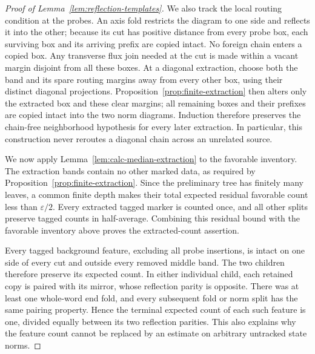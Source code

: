 \begin{proof}[Proof of Lemma~\ref{lem:reflection-templates}]
We also track the local routing condition at the probes. An axis fold
restricts the diagram to one side and reflects it into the other;
because its cut has positive distance from every probe box, each
surviving box and its arriving prefix are copied intact. No foreign
chain enters a copied box. Any transverse flux join needed at the
cut is made within a vacant margin disjoint from all these boxes.
At a diagonal extraction, choose both the band and its spare routing
margins away from every other box, using their distinct diagonal
projections. Proposition~\ref{prop:finite-extraction} then alters only
the extracted box and these clear margins; all remaining boxes and
their prefixes are copied intact into the two norm diagrams. Induction
therefore preserves the chain-free neighborhood hypothesis for every
later extraction. In particular, this construction never reroutes a
diagonal chain across an unrelated source.

We now apply Lemma~\ref{lem:calc-median-extraction} to the
favorable inventory. The extraction bands contain no other marked
data, as required by Proposition~\ref{prop:finite-extraction}.
Since the preliminary tree has finitely many leaves, a common
finite depth makes their total expected residual favorable count
less than $\varepsilon/2$. Every extracted tagged marker is counted
once, and all other splits preserve tagged counts in half-average.
Combining this residual bound with the favorable inventory above
proves the extracted-count assertion.

Every tagged background feature, excluding all probe insertions,
is intact on one side of every cut and outside every removed middle band.
The two children therefore preserve its expected count. In either
individual child, each retained copy is paired with its mirror,
whose reflection parity is opposite. There was at least one
whole-word end fold, and every subsequent fold or norm split has
the same pairing property. Hence the terminal expected count of
each such feature is one, divided equally between its two
reflection parities. This also explains why the feature count
cannot be replaced by an estimate on arbitrary untracked state
norms.


\end{proof}
